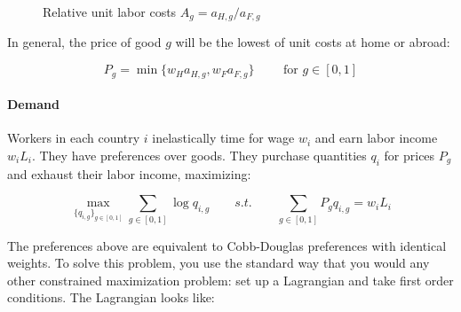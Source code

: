 \documentclass[11pt,letterpaper]{article}
\begin{document}
    \begin{figure}
        \centering
        \caption{Relative unit labor costs $A_g = a_{H,g} / a_{F,g}$}
        \label{fig: Ap}
    \end{figure}




In general, the price of good $g$ will be the lowest of unit costs at home or abroad:

        \begin{equation}
            P_{g} = \min\{w_H a_{H,g}, w_F a_{F,g}\}  \qquad \text{ for } g \in [0,1]
        \end{equation}

\paragraph{Demand} Workers in each country $i$ inelastically time for wage $w_i$ and earn labor income $w_i L_i$. They have preferences over goods. They purchase quantities $q_{i}$ for prices $P_{g}$ and exhaust their labor income, maximizing:

\begin{equation*}
    \max_{\{q_{i,g}\}_{g \in [0,1]}} \sum_{g \in [0,1]}  \log q_{i,g} \qquad s.t. \qquad \sum_{g \in [0,1]}  P_{g}  q_{i,g} = w_i L_i
\end{equation*}

The preferences above are equivalent to Cobb-Douglas preferences with identical weights. To solve this problem, you use the standard way that you would any other constrained maximization problem: set up a Lagrangian and take first order conditions. The Lagrangian looks like:
\end{document}
